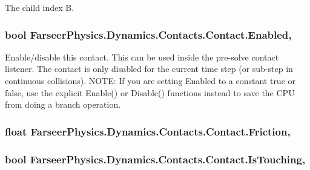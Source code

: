 The child index B.\hypertarget{class_farseer_physics_1_1_dynamics_1_1_contacts_1_1_contact_a68233bcbc44a590161f417c6e536480d}{
\subsubsection[{Enabled}]{\setlength{\rightskip}{0pt plus 5cm}bool Farseer\+Physics.\+Dynamics.\+Contacts.\+Contact.\+Enabled\hspace{0.3cm}{\ttfamily [get]}, {\ttfamily [set]}}}\label{class_farseer_physics_1_1_dynamics_1_1_contacts_1_1_contact_a68233bcbc44a590161f417c6e536480d}
Enable/disable this contact. This can be used inside the pre-\/solve contact listener. The contact is only disabled for the current time step (or sub-\/step in continuous collisions). N\+O\+T\+E\+: If you are setting Enabled to a constant true or false, use the explicit Enable() or Disable() functions instead to save the C\+P\+U from doing a branch operation. \hypertarget{class_farseer_physics_1_1_dynamics_1_1_contacts_1_1_contact_ac6ee00c35678be16250b1d9efe7ba648}{
\subsubsection[{Friction}]{\setlength{\rightskip}{0pt plus 5cm}float Farseer\+Physics.\+Dynamics.\+Contacts.\+Contact.\+Friction\hspace{0.3cm}{\ttfamily [get]}, {\ttfamily [set]}}}\label{class_farseer_physics_1_1_dynamics_1_1_contacts_1_1_contact_ac6ee00c35678be16250b1d9efe7ba648}
\hypertarget{class_farseer_physics_1_1_dynamics_1_1_contacts_1_1_contact_ae7147b96fbc97e5784cf23762b8562cd}{
\subsubsection[{Is\+Touching}]{\setlength{\rightskip}{0pt plus 5cm}bool Farseer\+Physics.\+Dynamics.\+Contacts.\+Contact.\+Is\+Touching\hspace{0.3cm}{\ttfamily [get]}, {\ttfamily [set]}}}\label{class_farseer_physics_1_1_dynamics_1_1_contacts_1_1_contact_ae7147b96fbc97e5784cf23762b8562cd}



